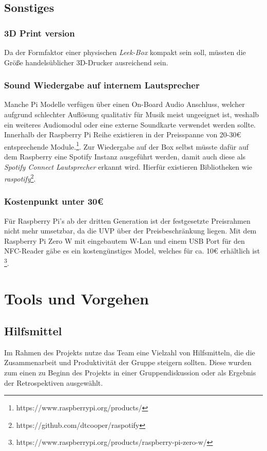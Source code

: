 \documentclass[10pt, a4paper]{article}
\begin{document}
\begin{onehalfspace}
\subsection{Sonstiges}
\subsubsection*{3D Print version}
Da der Formfaktor einer physischen \textit{Leek-Box} kompakt sein soll, müssten die Größe handelsüblicher 3D-Drucker ausreichend sein.

\subsubsection*{Sound Wiedergabe auf internem Lautsprecher}
Manche Pi Modelle verfügen über einen On-Board Audio Anschluss, welcher aufgrund schlechter Auflösung qualitativ für Musik meist ungeeignet ist, weshalb ein weiteres Audiomodul oder eine externe Soundkarte verwendet werden sollte.
Innerhalb der Raspberry Pi Reihe existieren in der Preisspanne von 20-30€ entsprechende Module.\footnote{https://www.raspberrypi.org/products/}.
Zur Wiedergabe auf der Box selbst müsste dafür auf dem Raspberry eine Spotify Instanz ausgeführt werden, damit auch diese als \textit{Spotify Connect Lautsprecher} erkannt wird.
Hierfür existieren Bibliotheken wie \textit{raspotify}\footnote{https://github.com/dtcooper/raspotify}.

\subsubsection*{Kostenpunkt unter 30€}
Für Raspberry Pi's ab der dritten Generation ist der festgesetzte Preisrahmen nicht mehr umsetzbar, da die UVP über der Preisbeschränkung liegen.
Mit dem Raspberry Pi Zero W mit eingebautem W-Lan und einem USB Port für den NFC-Reader gäbe es ein kostengünstiges Model, welches für ca. 10€ erhältlich ist \footnote{https://www.raspberrypi.org/products/raspberry-pi-zero-w/}.

\section{Tools und Vorgehen}
  \subsection{Hilfsmittel}
      Im Rahmen des Projekts nutze das Team eine Vielzahl von Hilfsmitteln, die die Zusammenarbeit und Produktivität der Gruppe steigern sollten.
      Diese wurden zum einen zu Beginn des Projekts in einer Gruppendiskussion oder als Ergebnis der Retrospektiven ausgewählt.


\end{onehalfspace}
\end{document}
